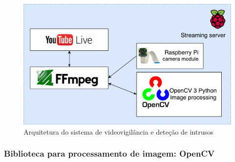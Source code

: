 



\begin{figure}[h]
	\centering
	\includegraphics[scale = 0.4]{esquemas/videostream.pdf}
	\caption{Arquitetura do sistema de videovigilância e deteção de intrusos }
	\label{arquiteturavisao}
\end{figure}



\subsubsection{Biblioteca para processamento de imagem: OpenCV}

